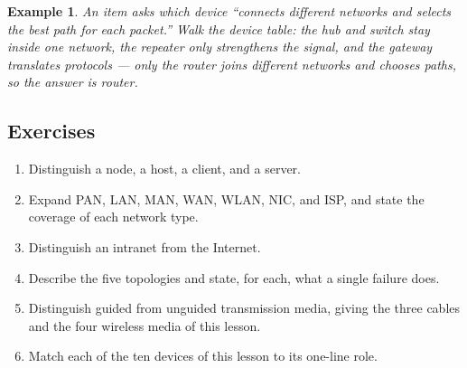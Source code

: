 \documentclass[11pt]{article}
\newtheorem{example}{Example}[section]
\begin{document}
\begin{example}
An item asks which device ``connects different networks and selects the best
path for each packet.'' Walk the device table: the hub and switch stay inside
one network, the repeater only strengthens the signal, and the gateway
translates protocols --- only the router joins different networks and
chooses paths, so the answer is router.
\end{example}

\subsection*{Exercises}
\begin{enumerate}[label=\arabic*.]
  \item Distinguish a node, a host, a client, and a server.
  \item Expand PAN, LAN, MAN, WAN, WLAN, NIC, and ISP, and state the coverage
    of each network type.
  \item Distinguish an intranet from the Internet.
  \item Describe the five topologies and state, for each, what a single
    failure does.
  \item Distinguish guided from unguided transmission media, giving the three
    cables and the four wireless media of this lesson.
  \item Match each of the ten devices of this lesson to its one-line role.
\end{enumerate}
\end{document}
